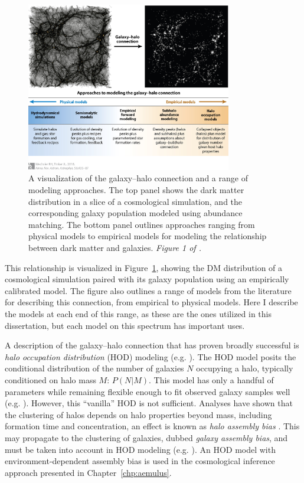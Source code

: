 \begin{figure}
    \centering
    \includegraphics[width=0.8\textwidth]{galhalo.jpg}
    \caption{A visualization of the galaxy--halo connection and a range of modeling approaches. The top panel shows the dark matter distribution in a slice of a cosmological simulation, and the corresponding galaxy population modeled using abundance matching. The bottom panel outlines approaches ranging from physical models to empirical models for modeling the relationship between dark matter and galaxies. \emph{Figure 1 of \cite{wechsler_connection_2018}.}}
    \label{fig:galhalo}
\end{figure}

This relationship is visualized in Figure~\ref{fig:galhalo}, showing the DM distribution of a cosmological simulation paired with its galaxy population using an empirically calibrated model.
The figure also outlines a range of models from the literature for describing this connection, from empirical to physical models.
Here I describe the models at each end of this range, as these are the ones utilized in this dissertation, but each model on this spectrum has important uses.

A description of the galaxy--halo connection that has proven broadly successful is \emph{halo occupation distribution} (HOD) modeling (e.g. \citealt{peacock_halo_2000,Seljak2000,BerlindWeinberg2002}). 
The HOD model posits the conditional distribution of the number of galaxies $N$ occupying a halo, typically conditioned on halo mass $M$: $P(N|M)$.
This model has only a handful of parameters while remaining flexible enough to fit observed galaxy samples well (e.g. \citealt{Zheng2005,reddick_connection_2013}).
However, this ``vanilla'' HOD is not sufficient.
Analyses have shown that the clustering of halos depends on halo properties beyond mass, including formation time and concentration, an effect is known as \emph{halo assembly bias} \citep{wechsler_concentrations_2002, Wechsler2006,mao_beyond_2018}.
This may propagate to the clustering of galaxies, dubbed \emph{galaxy assembly bias}, and must be taken into account in HOD modeling (e.g. \citealt{Tinker2008,hearin_introducing_2016}).
An HOD model with environment-dependent assembly bias is used in the cosmological inference approach presented in Chapter~\ref{chp:aemulus}.







